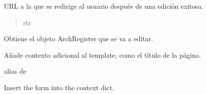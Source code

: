 \documentclass[letterpaper,10pt,spanish]{sphinxmanual}
\begin{document}
\begin{fulllineitems}
\begin{fulllineitems}
\begin{quote}
\begin{description}
\end{description}\end{quote}

\end{fulllineitems}



\begin{fulllineitems}

\pysigstartsignatures
{}
\pysigstopsignatures
\sphinxAtStartPar
URL a la que se redirige al usuario después de una edición exitosa.
\begin{quote}\begin{description}
\sphinxAtStartPar
str

\end{description}\end{quote}

\end{fulllineitems}



\begin{fulllineitems}

\pysigstartsignatures
{}
\pysigstopsignatures
\sphinxAtStartPar
Obtiene el objeto ArchRegister que se va a editar.

\end{fulllineitems}



\begin{fulllineitems}

\pysigstartsignatures
{}
\pysigstopsignatures
\sphinxAtStartPar
Añade contexto adicional al template, como el título de la página.

\end{fulllineitems}



\begin{fulllineitems}

\pysigstartsignatures
{}
\pysigstopsignatures
\sphinxAtStartPar
alias de 

\end{fulllineitems}



\begin{fulllineitems}

\pysigstartsignatures
{}
\pysigstopsignatures
\sphinxAtStartPar
Insert the form into the context dict.


\end{fulllineitems}
\end{fulllineitems}
\end{document}
